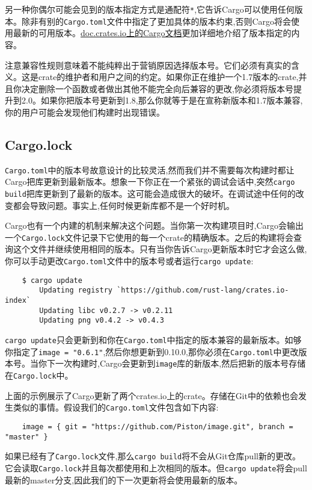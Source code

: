 另一种你偶尔可能会见到的版本指定方式是通配符\texttt{*},它告诉Cargo可以使用任何版本。除非有别的\texttt{Cargo.toml}文件中指定了更加具体的版本约束,否则Cargo将会使用最新的可用版本。\href{https://doc.rust-lang.org/cargo/reference/specifying-dependencies.html}{doc.crates.io上的Cargo文档}更加详细地介绍了版本指定的内容。

注意兼容性规则意味着不能纯粹出于营销原因选择版本号。它们必须有真实的含义。这是crate的维护者和用户之间的约定。如果你正在维护一个1.7版本的crate,并且你决定删除一个函数或者做出其他不能完全向后兼容的更改,你必须将版本号提升到2.0。如果你把版本号更新到1.8,那么你就等于是在宣称新版本和1.7版本兼容,你的用户可能会发现他们构建时出现错误。

\subsection{Cargo.lock}
\texttt{Cargo.toml}中的版本号故意设计的比较灵活,然而我们并不需要每次构建时都让Cargo把库更新到最新版本。想象一下你正在一个紧张的调试会话中,突然\texttt{cargo build}把库更新到了最新的版本。这可能会造成很大的破坏。在调试途中任何的改变都会导致问题。事实上,任何时候更新库都不是一个好时机。

Cargo也有一个内建的机制来解决这个问题。当你第一次构建项目时,Cargo会输出一个\texttt{Cargo.lock}文件记录下它使用的每一个crate的精确版本。之后的构建将会查询这个文件并继续使用相同的版本。只有当你告诉Cargo更新版本时它才会这么做,你可以手动更改\texttt{Cargo.toml}文件中的版本号或者运行\texttt{cargo update}:
\begin{verbatim}
    $ cargo update
        Updating registry `https://github.com/rust-lang/crates.io-index`
        Updating libc v0.2.7 -> v0.2.11
        Updating png v0.4.2 -> v0.4.3
\end{verbatim}

\texttt{cargo update}只会更新到和你在\texttt{Cargo.toml}中指定的版本兼容的最新版本。如够你指定了\texttt{image = "0.6.1"},然后你想更新到0.10.0,那你必须在\texttt{Cargo.toml}中更改版本号。当你下一次构建时,Cargo会更新到\texttt{image}库的新版本,然后把新的版本号存储在\texttt{Cargo.lock}中。

上面的示例展示了Cargo更新了两个crates.io上的crate。存储在Git中的依赖也会发生类似的事情。假设我们的\texttt{Cargo.toml}文件包含如下内容:
\begin{verbatim}
    image = { git = "https://github.com/Piston/image.git", branch = "master" }
\end{verbatim}

如果已经有了\texttt{Cargo.lock}文件,那么\texttt{cargo build}将不会从Git仓库pull新的更改。它会读取\texttt{Cargo.lock}并且每次都使用和上次相同的版本。但\texttt{cargo update}将会pull最新的master分支,因此我们的下一次更新将会使用最新的版本。

